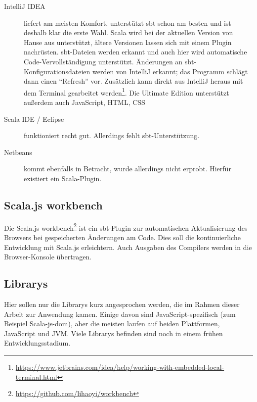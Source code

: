 \documentclass[a4paper, 12pt, hidelinks, listof=totoc, listoftables=totoc, bibliography=totoc]{scrreprt}
\begin{document}
\begin{description}
	\item[IntelliJ IDEA] liefert am meisten Komfort, unterstützt sbt schon am besten und ist deshalb klar die erste Wahl. Scala wird bei der aktuellen Version von Hause aus unterstützt, ältere Versionen lassen sich mit einem Plugin nachrüsten. sbt-Dateien werden erkannt und auch hier wird automatische Code-Vervollständigung unterstützt. Änderungen an sbt-Konfigurationsdateien werden von IntelliJ erkannt; das Programm schlägt dann einen "`Refresh"' vor. Zusätzlich kann direkt aus IntelliJ heraus mit dem Terminal gearbeitet werden\footnote{\url{https://www.jetbrains.com/idea/help/working-with-embedded-local-terminal.html}}. Die Ultimate Edition unterstützt außerdem auch JavaScript, \ac{HTML}, \ac{CSS}
	\item[Scala IDE / Eclipse] funktioniert recht gut. Allerdings fehlt sbt-Unterstützung.
	\item[Netbeans] kommt ebenfalls in Betracht, wurde allerdings nicht erprobt. Hierfür existiert ein Scala-Plugin.
\end{description}



\subsection{Scala.js workbench}

Die Scala.js workbench\footnote{\url{https://github.com/lihaoyi/workbench}} ist ein sbt-Plugin zur automatischen Aktualisierung des Browsers 
bei gespeicherten Änderungen am Code. Dies soll die kontinuierliche Entwicklung mit Scala.js erleichtern. Auch Ausgaben des Compilers werden in die Browser-Konsole übertragen.


\subsection{Librarys}

Hier sollen nur die Librarys kurz angesprochen werden, die im Rahmen dieser Arbeit zur Anwendung kamen. Einige davon sind JavaScript-spezifisch (zum Beispiel Scala-js-dom), aber die meisten laufen auf beiden Plattformen, JavaScript und \ac{JVM}. Viele Librarys befinden sind noch in einem frühen Entwicklungsstadium.
\end{document}
